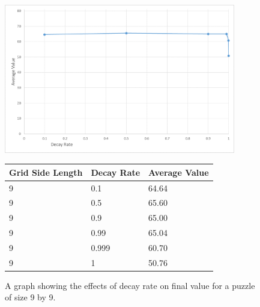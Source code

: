 \documentclass[12pt]{article}
\begin{document}
\begin{figure}[H]
    \centering
    \includegraphics[width=0.9\textwidth]{simulated_annealing_9x9_decay_excel}
\begin{tabular}{ |p{4cm}||p{4cm}|p{4cm}|  }
 \hline
Grid Side Length& Decay Rate &Average Value\\
 \hline
9&0.1&64.64\\
9&0.5&65.60\\
9&0.9&65.00\\
9&0.99&65.04\\
9&0.999&60.70\\
9&1&50.76\\
 \hline
\end{tabular}
    \caption{A graph showing the effects of decay rate on final value for a puzzle of size 9 by 9.}
    \label{fig:simulated_annealing_9x9_decay}
\end{figure}
\end{document}

